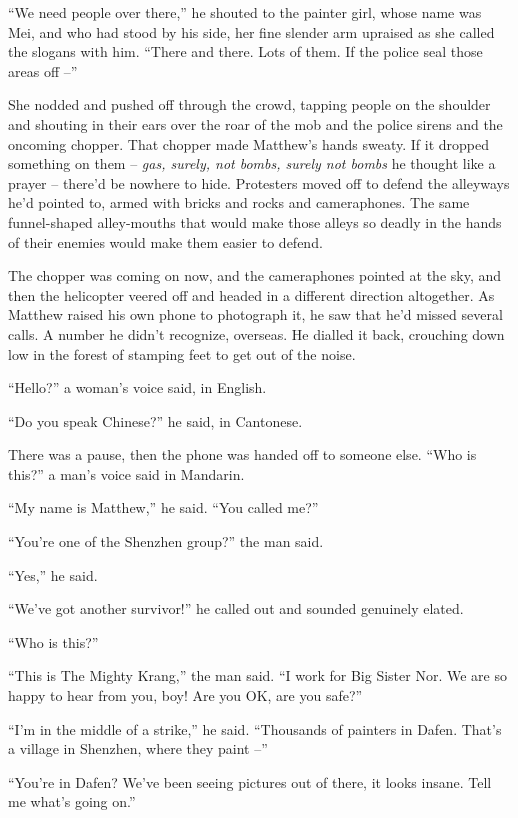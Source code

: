 ``We need people over there,'' he shouted to the painter girl, whose
name was Mei, and who had stood by his side, her fine slender arm
upraised as she called the slogans with him. ``There and there. Lots
of them. If the police seal those areas off --''

She nodded and pushed off through the crowd, tapping people on the
shoulder and shouting in their ears over the roar of the mob and
the police sirens and the oncoming chopper. That chopper made
Matthew's hands sweaty. If it dropped something on them --
\emph{gas, surely, not bombs, surely not bombs} he thought like a
prayer -- there'd be nowhere to hide. Protesters moved off to
defend the alleyways he'd pointed to, armed with bricks and rocks
and cameraphones. The same funnel-shaped alley-mouths that would
make those alleys so deadly in the hands of their enemies would
make them easier to defend.

The chopper was coming on now, and the cameraphones pointed at the
sky, and then the helicopter veered off and headed in a different
direction altogether. As Matthew raised his own phone to photograph
it, he saw that he'd missed several calls. A number he didn't
recognize, overseas. He dialled it back, crouching down low in the
forest of stamping feet to get out of the noise.

``Hello?'' a woman's voice said, in English.

``Do you speak Chinese?'' he said, in Cantonese.

There was a pause, then the phone was handed off to someone else.
``Who is this?'' a man's voice said in Mandarin.

``My name is Matthew,'' he said. ``You called me?''

``You're one of the Shenzhen group?'' the man said.

``Yes,'' he said.

``We've got another survivor!'' he called out and sounded genuinely
elated.

``Who is this?''

``This is The Mighty Krang,'' the man said. ``I work for Big Sister
Nor. We are so happy to hear from you, boy! Are you OK, are you
safe?''

``I'm in the middle of a strike,'' he said. ``Thousands of painters in
Dafen. That's a village in Shenzhen, where they paint --''

``You're in Dafen? We've been seeing pictures out of there, it looks
insane. Tell me what's going on.''


